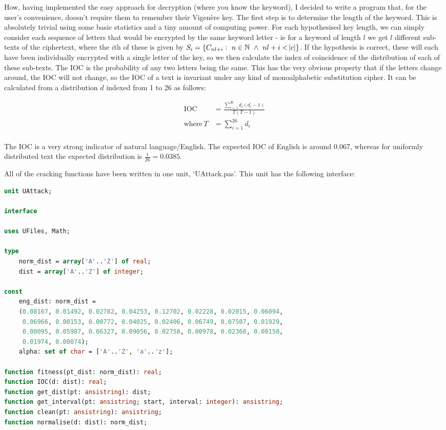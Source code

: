 \documentclass{article}
\begin{document}
    How, having implemented the easy approach for decryption (where you know
    the keyword), I decided to write a program that, for the user's
    convenience, doesn't require them to remember their Vigen\`ere key. The
    first step is to determine the length of the keyword. This is absolutely
    trivial using some basic statistics and a tiny amount of computing power.
    For each hypothesised key length, we can simply consider each sequence of
    letters that would be encrypted by the same keyword letter - ie for a
    keyword of length $l$ we get $l$ different sub-texts of the ciphertext,
    where the $i$th of these is given by $S_i = \{C_{nl + i}:\ n \in \mathbb{N}
    \ \land\ nl + i < \abs{c}\}$. If the hypothesis is correct, these will each
    have been individually encrypted with a single letter of the key, so  we
    then calculate the index of coincidence of the distribution of each of
    these sub-texts. The IOC is the probability of any two letters being the
    same. This has the very obvious property that if the letters change around,
    the IOC will not change, so the IOC of a text is invariant under any kind
    of monoalphabetic substitution cipher. It can be calculated from a
    distribution $d$ indexed from 1 to 26 as follows:

\begin{align*}
    \text{IOC}\ &= \frac{\sum\limits_{i = 1}^{26} d_i (d_i - 1)}{T (T - 1)}\\
    \text{where}\ T &= \sum\limits_{i = 1}^{26} d_i\\
\end{align*}

    The IOC is a very strong indicator of natural language/English. The
    expected IOC of English is around 0.067, whereas for uniformly distributed
    text the expected distribution is $\frac{1}{26} = 0.0385$.

    All of the cracking functions have been written in one unit, `UAttack.pas'.
    This unit has the following interface:

\begin{lstlisting}[language=Pascal, caption=UAttack interface]
unit UAttack;

interface

uses UFiles, Math;

type
    norm_dist = array['A'..'Z'] of real;
    dist = array['A'..'Z'] of integer;

const
    eng_dist: norm_dist =
    (0.08167, 0.01492, 0.02782, 0.04253, 0.12702, 0.02228, 0.02015, 0.06094,
     0.06966, 0.00153, 0.00772, 0.04025, 0.02406, 0.06749, 0.07507, 0.01929,
     0.00095, 0.05987, 0.06327, 0.09056, 0.02758, 0.00978, 0.02360, 0.00150,
     0.01974, 0.00074);
    alpha: set of char = ['A'..'Z', 'a'..'z'];

function fitness(pt_dist: norm_dist): real;
function IOC(d: dist): real;
function get_dist(pt: ansistring): dist;
function get_interval(pt: ansistring; start, interval: integer): ansistring;
function clean(pt: ansistring): ansistring;
function normalise(d: dist): norm_dist;
\end{lstlisting}
\end{document}
